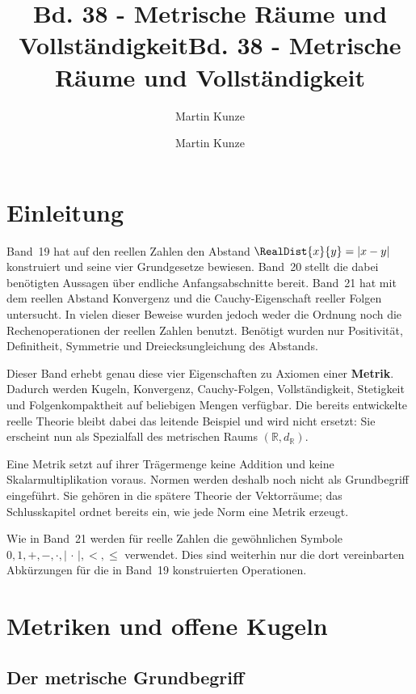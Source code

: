 \documentclass[main.tex]{subfiles}
\title{Bd. 38 - Metrische Räume und Vollständigkeit}
\author{Martin Kunze}
\date{}
\begin{document}
\title{Bd. 38 - Metrische Räume und Vollständigkeit}
\author{Martin Kunze}
\date{}
\hypersetup{pageanchor=false}
\maketitle
\hypersetup{pageanchor=true}
\setcounter{tocdepth}{3}
\tableofcontents
\setcounter{file}{38}
\renewcommand{\FormulaBandID}{38}

\chapter{Einleitung}

Band~19 hat auf den reellen Zahlen den Abstand
\(\RealDist{x}{y}=|x-y|\) konstruiert und seine vier Grundgesetze bewiesen.
Band~20 stellt die dabei benötigten Aussagen über endliche Anfangsabschnitte
bereit. Band~21 hat mit dem reellen Abstand Konvergenz und die
Cauchy-Eigenschaft reeller Folgen untersucht. In vielen dieser Beweise wurden
jedoch weder die Ordnung noch die Rechenoperationen der reellen Zahlen
benutzt. Benötigt wurden nur Positivität, Definitheit, Symmetrie und
Dreiecksungleichung des Abstands.

Dieser Band erhebt genau diese vier Eigenschaften zu Axiomen einer
\textbf{Metrik}. Dadurch werden Kugeln, Konvergenz, Cauchy-Folgen,
Vollständigkeit, Stetigkeit und Folgenkompaktheit auf beliebigen Mengen
verfügbar. Die bereits entwickelte reelle Theorie bleibt dabei das leitende
Beispiel und wird nicht ersetzt: Sie erscheint nun als Spezialfall des
metrischen Raums \((\mathbb R,d_{\mathbb R})\).

Eine Metrik setzt auf ihrer Trägermenge keine Addition und keine
Skalarmultiplikation voraus. Normen werden deshalb noch nicht als
Grundbegriff eingeführt. Sie gehören in die spätere Theorie der Vektorräume;
das Schlusskapitel ordnet bereits ein, wie jede Norm eine Metrik erzeugt.

Wie in Band~21 werden für reelle Zahlen die gewöhnlichen Symbole
\(0,1,+,-,\cdot,|\,\cdot\,|,<,\leq\) verwendet. Dies sind weiterhin nur die
dort vereinbarten Abkürzungen für die in Band~19 konstruierten Operationen.

\chapter{Metriken und offene Kugeln}

\section{Der metrische Grundbegriff}
\end{document}

